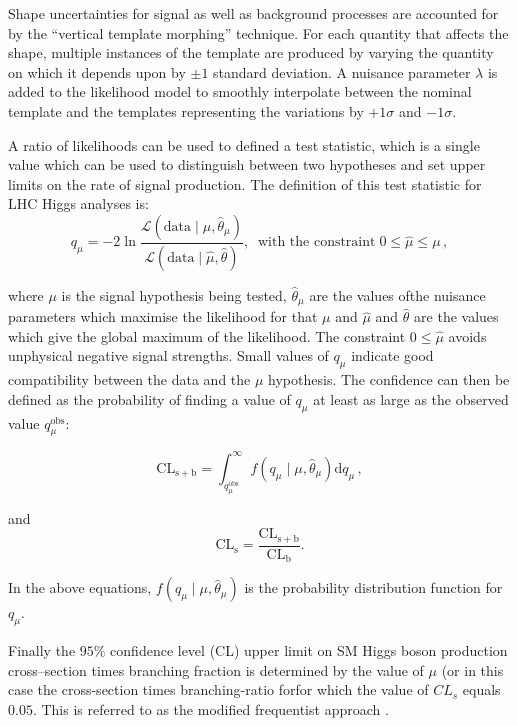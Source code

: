 Shape uncertainties for signal as well as background processes are accounted 
for by the ``vertical template morphing'' technique. For each quantity that affects the shape,
multiple instances of the template are produced by varying the quantity on which it 
depends upon by $\pm 1$ standard deviation. A nuisance parameter $\lambda$ is added to the likelihood model 
to smoothly interpolate between the nominal template
and the templates representing the variations by $+1 \sigma$ and $-1 \sigma$.

A ratio of likelihoods can be used to defined a test statistic, which is a
single value which can be used to distinguish between two hypotheses and set
upper limits on the rate of signal production. The definition of this test
statistic for LHC Higgs analyses is: 
\begin{equation}
q_{\mu} = -2
\ln\frac{\mathcal{L}(\mathrm{data}\mid\mu,\hat{\theta}_{\mu})}{\mathcal{L}(\mathrm{data}\mid\hat{\mu},\hat{\theta})},
\;\; \text{with the constraint} \; 0\leq\hat{\mu}\leq\mu\, ,
\end{equation}

where $\mu$ is the signal hypothesis being tested, $\hat{\theta}_{\mu}$ are the
values ofthe nuisance parameters which maximise the likelihood for that $\mu$
and $\hat{\mu}$ and $\hat{\theta}$ are the values which give the global maximum
of the likelihood. The constraint $0\leq\hat{\mu}$ avoids unphysical negative
signal strengths. Small values of $q_{\mu}$ indicate good compatibility between
the data and the $\mu$ hypothesis. The confidence can then be defined as the
probability of finding a value of $q_{\mu}$ at least as large as the observed
value $q_{\mu}^{\mathrm{obs}}$: 

\begin{equation} \label{eqn:cl_splusb}
\mathrm{CL_{s+b}} =
\int_{q_{\mu}^{\mathrm{obs}}}^{\infty}f(q_{\mu}\mid\mu,\hat{\theta}_{\mu})\mathrm{d}q_{\mu}\,
,
\end{equation}

and 
\begin{equation}
\mathrm{CL_{s}} = \frac{\mathrm{CL_{s+b}}}{\mathrm{CL_{b}}}.
\end{equation}

In the above equations, $f(q_{\mu}\mid\mu,\hat{\theta}_{\mu})$ is the
probability distribution function for $q_{\mu}$. 

Finally the $95\%$ confidence level (CL) upper limit on \ac{SM} Higgs boson production
cross--section times branching fraction is determined by the value of $\mu$ (or
in this case the cross-section times branching-ratio forfor which the value of 
$CL_{s}$ equals $0.05$. This is referred to as the modified frequentist approach
\cite{Read2}.

